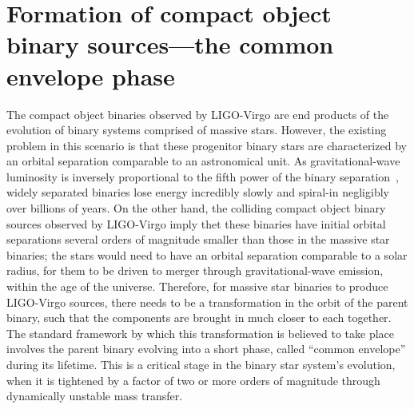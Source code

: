 \section{Formation of compact object binary sources---the common envelope phase}
The compact object binaries observed by LIGO-Virgo are end products of the evolution of binary systems comprised of massive stars. However, the existing problem in this scenario is that these progenitor binary stars are characterized by an orbital separation comparable to an astronomical unit. As gravitational-wave luminosity is inversely proportional to the fifth power of the binary separation~\cite{PhysRev.136.B1224}, widely separated binaries lose energy incredibly slowly and spiral-in negligibly over billions of years. On the other hand, the colliding compact object binary sources observed by LIGO-Virgo imply thet these binaries have initial orbital separations several orders of magnitude smaller than those in the massive star binaries; the stars would need to have an orbital separation comparable to a solar radius, for them to be driven to merger through gravitational-wave emission, within the age of the universe. Therefore, for massive star binaries to produce LIGO-Virgo sources, there needs to be a transformation in the orbit of the parent binary, such that the components are brought in much closer to each together. The standard framework by which this transformation is believed to take place involves the parent binary evolving into a short phase, called ``common envelope'' during its lifetime. This is a critical stage in the binary star system's evolution, when it is tightened by a factor of two or more orders of magnitude through dynamically unstable mass transfer.

